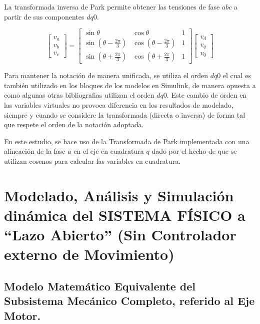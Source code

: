 \documentclass[blue,fullpaper]{ludusofficial}  %
\begin{document}
La transformada inversa de Park permite obtener las tensiones de fase $abc$ a partir de sus componentes $dq0$.

\begin{equation}
\label{eq:park-inversa}
\begin{bmatrix}
    v_a \\ v_b \\v_c
\end{bmatrix} 
=
\begin{bmatrix}
    \sin \theta & \cos \theta  & 1 \\[1em]
     \sin\left(\theta - \frac{2\pi}{3}\right) & \cos\left(\theta - \frac{2\pi}{3}\right) & 1 \\[1em]
     \sin\left(\theta + \frac{2\pi}{3}\right) & \cos\left(\theta + \frac{2\pi}{3}\right) & 1
\end{bmatrix}
\begin{bmatrix}
    v_d \\ v_q \\v_0
\end{bmatrix} 
\end{equation}

Para mantener la notación de manera unificada, se utiliza el orden $dq0$ el cual es también utilizado en los bloques de los modelos en Simulink, de manera opuesta a como algunas otras bibliografias utilizan el orden $dq0$. Este cambio de orden en las variables virtuales no provoca diferencia en los resultados de modelado, siempre y cuando se considere la transformada (directa o inversa) de forma tal que respete el orden de la notación adoptada.

En este estudio, se hace uso de la Transformada de Park implementada con una alineación de la fase $a$ cn el eje en cuadratura $q$ dado por el hecho de que se utilizan cosenos para calcular las variables en cuadratura. 

\clearpage
\section{Modelado, Análisis y Simulación dinámica del SISTEMA FÍSICO a “Lazo
Abierto” (Sin Controlador externo de Movimiento)}

\subsection{Modelo Matemático Equivalente del Subsistema Mecánico Completo, referido al Eje Motor.}
\end{document}

